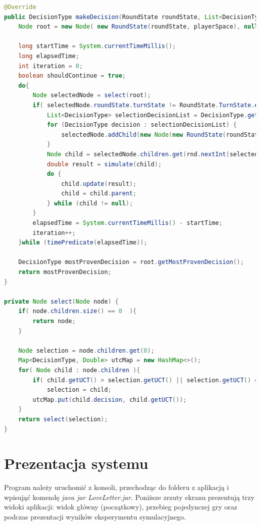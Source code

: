 \begin{lstlisting}[language=java,label=lst:mcts,caption=Wybrane metody klasy MctsAlgorithm, breaklines=true]
@Override
public DecisionType makeDecision(RoundState roundState, List<DecisionType> decisionList) {
	Node root = new Node( new RoundState(roundState, playerSpace), null );
	
	long startTime = System.currentTimeMillis();
	long elapsedTime;
	int iteration = 0;
	boolean shouldContinue = true;
	do{
		Node selectedNode = select(root);
		if( selectedNode.roundState.turnState != RoundState.TurnState.ended ) {
			List<DecisionType> selectionDecisionList = DecisionType.getDecisions(selectedNode.roundState.spaceOfFirstPlayer.hand);
			for (DecisionType decision : selectionDecisionList) {
				selectedNode.addChild(new Node(new RoundState(roundState, roundState.spaceOfFirstPlayer), decision));
			}
			Node child = selectedNode.children.get(rnd.nextInt(selectedNode.children.size()));
			double result = simulate(child);
			do {
				child.update(result);
				child = child.parent;
			} while (child != null);
		}
		elapsedTime = System.currentTimeMillis() - startTime;
		iteration++;
	}while (timePredicate(elapsedTime));
	
	DecisionType mostProvenDecision = root.getMostProvenDecision();
	return mostProvenDecision;
}
    
private Node select(Node node) {
	if( node.children.size() == 0  ){
		return node;
	}
	
	Node selection = node.children.get(0);
	Map<DecisionType, Double> utcMap = new HashMap<>();
	for( Node child : node.children ){
		if( child.getUCT() > selection.getUCT() || selection.getUCT() == 0 )
			selection = child;
		utcMap.put(child.decision, child.getUCT());
	}
	return select(selection);
}

\end{lstlisting}
\clearpage

\section{Prezentacja systemu}
Program należy uruchomić z konsoli, przechodząc do folderu z aplikacją i wpisująć komendę \textit{java \-jar LoveLetter.jar}. Poniższe zrzuty ekranu prezentują trzy widoki aplikacji: widok główny  (początkowy), przebieg pojedynczej gry oraz podczas prezentacji wyników eksperymentu symulacyjnego.
